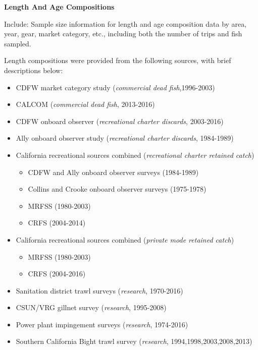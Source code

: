 \documentclass[12pt,]{article}
\begin{document}
\textbf{Length And Age Compositions}

Include: Sample size information for length and age composition data by
area, year, gear, market category, etc., including both the number of
trips and fish sampled.

Length compositions were provided from the following sources, with brief
descriptions below:

\begin{itemize}[noitemsep,nolistsep,topsep=0pt]
  \item CDFW market category study (\emph{commercial dead fish},1996-2003)    
  \item CALCOM (\emph{commercial dead fish}, 2013-2016)    
  \item CDFW onboard observer (\emph{recreational charter discards}, 2003-2016)    
  \item Ally onboard observer study (\emph{recreational charter discards}, 1984-1989)  
  \item California recreational sources combined (\emph{recreational charter retained catch})     
    \begin{itemize}[noitemsep,nolistsep]
      \item CDFW and Ally onboard observer surveys (1984-1989)     
      \item Collins and Crooke onboard observer surveys (1975-1978)     
      \item MRFSS (1980-2003)     
      \item CRFS (2004-2014)
    \end{itemize}
 \item California recreational sources combined (\emph{private mode retained catch})      
    \begin{itemize}[noitemsep,nolistsep]   
      \item MRFSS (1980-2003)      
      \item CRFS (2004-2016)  
    \end{itemize}
 \item Sanitation district trawl surveys (\emph{research}, 1970-2016)      
 \item CSUN/VRG gillnet survey (\emph{research}, 1995-2008)        
 \item Power plant impingement surveys (\emph{research}, 1974-2016) 
 \item Southern California Bight trawl survey (\emph{research}, 1994,1998,2003,2008,2013) 
\end{itemize}
\end{document}
